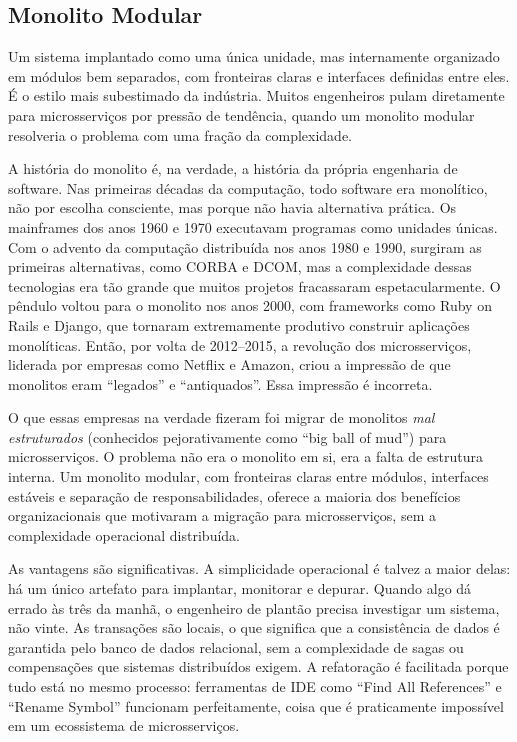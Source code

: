 \subsection{Monolito Modular}

Um sistema implantado como uma única unidade, mas internamente
organizado em módulos bem separados, com fronteiras claras e interfaces definidas
entre eles. É o estilo mais subestimado da indústria. Muitos engenheiros pulam
diretamente para microsserviços por pressão de tendência, quando um monolito
modular resolveria o problema com uma fração da complexidade.

A história do monolito é, na verdade, a história da própria engenharia de software.
Nas primeiras décadas da computação, todo software era monolítico, não por
escolha consciente, mas porque não havia alternativa prática. Os mainframes dos
anos 1960 e 1970 executavam programas como unidades únicas. Com o advento da
computação distribuída nos anos 1980 e 1990, surgiram as primeiras alternativas,
como CORBA e DCOM, mas a complexidade dessas tecnologias era tão grande que
muitos projetos fracassaram espetacularmente. O pêndulo voltou para o monolito
nos anos 2000, com frameworks como Ruby on Rails e Django, que tornaram
extremamente produtivo construir aplicações monolíticas. Então, por volta de
2012--2015, a revolução dos microsserviços, liderada por empresas como Netflix
e Amazon, criou a impressão de que monolitos eram ``legados'' e ``antiquados''.
Essa impressão é incorreta.

O que essas empresas na verdade fizeram foi migrar de monolitos \textit{mal
estruturados} (conhecidos pejorativamente como ``big ball of mud'') para
microsserviços. O problema não era o monolito em si, era a falta de
estrutura interna. Um monolito modular, com fronteiras claras entre
módulos, interfaces estáveis e separação de responsabilidades, oferece
a maioria dos benefícios organizacionais que motivaram a migração para
microsserviços, sem a complexidade operacional distribuída.

As vantagens são significativas. A simplicidade operacional é talvez a maior
delas: há um único artefato para implantar, monitorar e depurar. Quando algo
dá errado às três da manhã, o engenheiro de plantão precisa investigar um
sistema, não vinte. As transações são locais, o que significa que a consistência
de dados é garantida pelo banco de dados relacional, sem a complexidade de
sagas ou compensações que sistemas distribuídos exigem. A refatoração é
facilitada porque tudo está no mesmo processo: ferramentas de IDE como ``Find
All References'' e ``Rename Symbol'' funcionam perfeitamente, coisa que é
praticamente impossível em um ecossistema de microsserviços.

